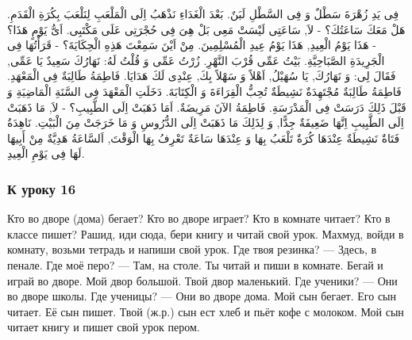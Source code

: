 \documentclass[a5paper]{article}
\begin{document}
فِى يَدِ زُهْرَةَ سَطْلٌ وَ فِى السَّطْلِ لَبَنٌ. بَعْدَ الْغَدَاءِ نَذْهَبُ اِلَى الْمَلْعَبِ لِنَلْعَبَ بِكُرَةِ الْقَدَمِ. هَلْ مَعَكَ سَاعَتُكَ؟ - لاَ, سَاعَتِى لَيْسَتْ مَعِى بَلْ هِىَ فِى حُجْرَتِى عَلَى مَكْتَبِى. اَىُّ يَوْمٍ هَذَا؟ - هَذَا يَوْمُ الْعِيدِ, هَذَا يَوْمُ عِيدِ الْمُسْلِمِينَ. مِنْ اَيْنَ سَمِعْتَ هَذِهِ الْحِكَايَةَ؟ - قَرَأْتُهَا فِى الْجَرِيدَةِ الصَّبَاحِيَّةِ. بَيْتُ عَمِّى قُرْبَ النَّهْرِ. زُرْتُ عَمِّى وَ قُلْتُ لَهُ: نَهَارُكَ سَعِيدٌ يَا عَمِّى, فَقَالَ لِى: وَ نَهَارُكَ, يَا سُهَيْلُ, اَهْلاً وَ سَهْلاً بِكَ, عِنْدِى لَكَ هَدَايَا. فَاطِمَةُ طَالِبَةٌ فِى الْمَعْهَدِ. فَاطِمَةُ طَالِبَةٌ مُجْتَهِدَةٌ نَشِيطَةٌ تُحِبُّ الْقِرَاءَةَ وَ الْكِتَابَةَ. دَخَلَتِ الْمَعْهَدَ فِى السَّنَةِ الْمَاضِيَةِ وَ قَبْلَ ذَلِكَ دَرَسَتْ فِى الْمَدْرَسَةِ. فَاطِمَةُ الآنَ مَرِيضَةٌ. اَمَا ذَهَبَتْ اِلَى الطَّبِيبِ؟ - لاَ, مَا ذَهَبَتْ اِلَى الطَّبِيبِ اِنَّهَا ضَعِيفَةٌ جِدًّا, وَ لِذَلِكَ مَا ذَهَبَتْ اِلَى الدُّرُوسِ وَ مَا خَرَجَتْ مِنَ الْبَيْتِ. نَاهِدَةُ فَتَاةٌ نَشِيطَةٌ عِنْدَهَا كُرَةٌ تَلْعَبُ بِهَا وَ عِنْدَهَا سَاعَةٌ تَعْرِفُ بِهَا الْوَقْتَ, اَلسَّاعَةُ هَدِيَّةٌ مِنْ أَبِيهَا لَهَا فِى يَوْمِ الْعِيدِ. 

\subsubsection{К уроку 16}
Кто во дворе (дома) бегает? Кто во дворе играет? Кто в комнате читает? Кто в классе пишет? Рашид, иди сюда, бери книгу и читай свой урок. Махмуд, войди в комнату, возьми тетрадь и напиши свой урок. Где твоя резинка? — Здесь, в пенале. Где моё перо? — Там, на столе. Ты читай и пиши в комнате. Бегай и играй во дворе. Мой двор большой. Твой двор маленький. Где ученики? — Они во дворе школы. Где ученицы? — Они во дворе дома. Мой сын бегает. Его сын читает. Её сын пишет. Твой (ж.р.) сын ест хлеб и пьёт кофе с молоком. Мой сын читает книгу и пишет свой урок пером.
\end{document}
